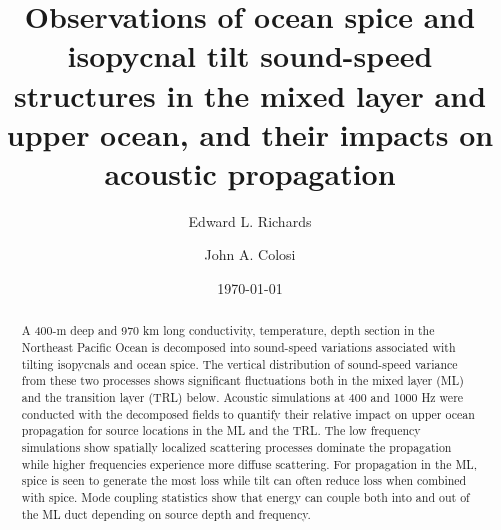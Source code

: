 \documentclass[preprint,NumberedRefs]{JASA}
\begin{document}
\title[Mixed layer tilt and spice]{Observations of ocean spice and isopycnal tilt sound-speed structures in the mixed layer and upper ocean, and their impacts on acoustic propagation}
\author{Edward L. Richards}
\author{John A. Colosi}

\date{\today}

\begin{abstract}
A 400-m deep and 970 km long conductivity, temperature, depth section in the Northeast Pacific Ocean is decomposed into sound-speed variations associated with tilting isopycnals and ocean spice. The vertical distribution of sound-speed variance from these two processes shows significant fluctuations both in the mixed layer (ML) and the transition layer (TRL) below. Acoustic simulations at 400 and 1000 Hz were conducted with the decomposed fields to quantify their relative impact on upper ocean propagation for source locations in the ML and the TRL. The low frequency simulations show spatially localized scattering processes dominate the propagation while higher frequencies experience more diffuse scattering. For propagation in the ML, spice is seen to generate the most loss while tilt can often reduce loss when combined with spice. Mode coupling statistics show that energy can couple both into and out of the ML duct depending on source depth and frequency.
\end{abstract}
\renewcommand{\arraystretch}{0.5}
\maketitle
\end{document}
